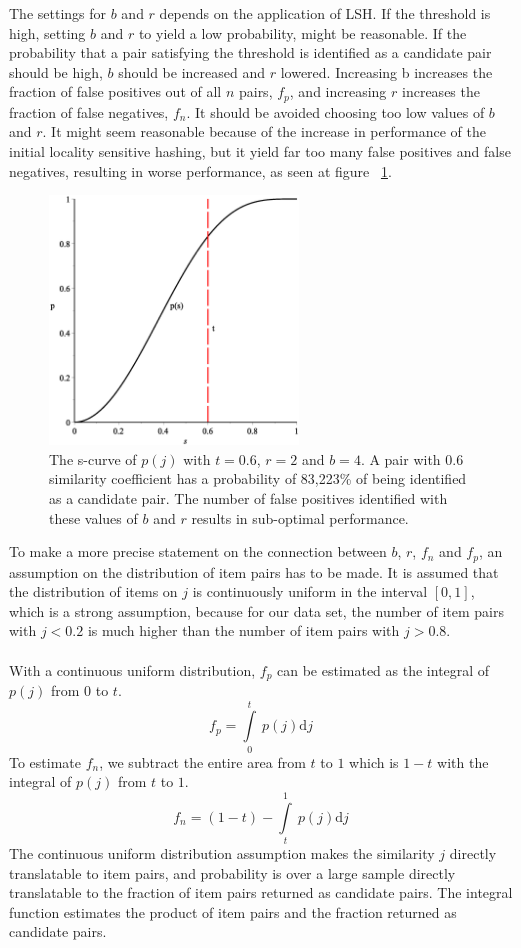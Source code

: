 The settings for \(b\) and \(r\) depends on the application of LSH. If the threshold is high, setting \(b\) and \(r\) to yield a low probability, might be reasonable. If the probability that a pair satisfying the threshold is identified as a candidate pair should be high, \(b\) should be increased and \(r\) lowered. Increasing b increases the fraction of false positives out of all \(n\) pairs, \(f_p\), and increasing \(r\) increases the fraction of false negatives, \(f_n\). It should be avoided choosing too low values of \(b\) and \(r\). It might seem reasonable because of the increase in performance of the initial locality sensitive hashing, but it yield far too many false positives and false negatives, resulting in worse performance, as seen at figure ~\ref{fig:p_graph_low}.

\begin{figure}[H]
	\includegraphics[width=250px]{img/pGraphLow.eps}
	\caption{The s-curve of \(p(j)\) with \(t = 0.6\), \(r = 2\) and \(b =4\). A pair with 0.6 similarity coefficient has a probability of 83,223\% of being identified as a candidate pair. The number of false positives identified with these values of \(b\) and \(r\) results in sub-optimal performance.} 
	\label{fig:p_graph_low}
\end{figure}

To make a more precise statement on the connection between \(b\), \(r\), \(f_n\) and \(f_p\), an assumption on the distribution of item pairs has to be made. It is assumed that the distribution of items on \(j\) is continuously uniform in the interval \([0, 1]\), which is a strong assumption, because for our data set, the number of item pairs with \(j<0.2\) is much higher than the number of item pairs with \(j>0.8\).\\ \\
With a continuous uniform distribution, \(f_p\) can be estimated as the integral of \(p(j)\) from 0 to \(t\).
\[f_p = \int\limits_0^t\ p(j)\mathrm{d}j\]
To estimate \(f_n\), we subtract the entire area from \(t\) to \(1\) which is \(1-t\) with the integral of \(p(j)\) from \(t\) to \(1\).
\[f_n = (1-t)-\int\limits_t^1\ p(j)\mathrm{d}j\]
The continuous uniform distribution assumption makes the similarity \(j\) directly translatable to item pairs, and probability is over a large sample directly translatable to the fraction of item pairs returned as candidate pairs. The integral function estimates the product of item pairs and the fraction returned as candidate pairs.


